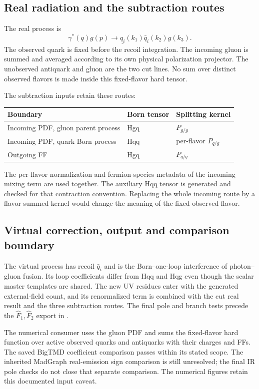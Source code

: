 \documentclass[11pt,a4paper]{article}
\newcommand{\Fhat}{\widehat F}
\newcommand{\obs}[1]{\underline{#1}}
\begin{document}
\subsection{Real radiation and the subtraction routes}

The real process is
\begin{equation}
 \gamma^*(q)g(p)\to\obs{q_i}(k_1)\bar q_i(k_2)g(k_3).
\end{equation}
The observed quark is fixed before the recoil integration. The incoming
gluon is summed and averaged according to its own physical polarization
projector. The unobserved antiquark and gluon are the two cut lines.
No sum over distinct observed flavors is made inside this fixed-flavor
hard tensor.

The subtraction inputs retain these routes:
\begin{center}
\begin{tabular}{@{}lll@{}}
\toprule
Boundary & Born tensor & Splitting kernel\\
\midrule
Incoming PDF, gluon parent process & Hgq & $P_{g/g}$\\
Incoming PDF, quark Born process & Hqq & per-flavor $P_{q/g}$\\
Outgoing FF & Hgq & $P_{q/q}$\\
\bottomrule
\end{tabular}
\end{center}
The per-flavor normalization and fermion-species metadata of the
incoming mixing term are used together. The auxiliary Hqq tensor is
generated and checked for that contraction convention. Replacing the
whole incoming route by a flavor-summed kernel would change the meaning
of the fixed observed flavor.

\subsection{Virtual correction, output and comparison boundary}

The virtual process has recoil $\bar q_i$ and is the Born--one-loop
interference of photon--gluon fusion. Its loop coefficients differ from
Hqq and Hqg even though the scalar master templates are shared. The new
UV residues enter with the generated external-field count, and its
renormalized term is combined with the cut real result and the three
subtraction routes. The final pole and branch tests precede the
$\Fhat_1,\Fhat_2$ export in .

The numerical consumer uses the gluon PDF and sums the fixed-flavor
hard function over active observed quarks and antiquarks with their
charges and FFs. The saved BigTMD coefficient comparison passes within
its stated scope. The inherited MadGraph real-emission sign comparison
is still unresolved; the final IR pole checks do not close that separate
comparison. The numerical figures retain this documented input caveat.
\end{document}
